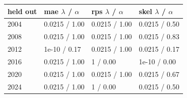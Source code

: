 
\begin{tabular}{llll}
\toprule
held out & mae $\lambda$ / $\alpha$ & rps $\lambda$ / $\alpha$ & skel $\lambda$ / $\alpha$\\
\midrule
2004 & 0.0215 / 1.00 & 0.0215 / 1.00 & 0.0215 / 0.50\\
2008 & 0.0215 / 1.00 & 0.0215 / 1.00 & 0.0215 / 0.83\\
2012 & 1e-10 / 0.17 & 0.0215 / 1.00 & 0.0215 / 0.17\\
2016 & 0.0215 / 1.00 & 1 / 0.00 & 1e-10 / 0.00\\
2020 & 0.0215 / 1.00 & 0.0215 / 1.00 & 0.0215 / 0.67\\
2024 & 0.0215 / 1.00 & 1 / 0.00 & 0.0215 / 0.50\\
\bottomrule
\end{tabular}
